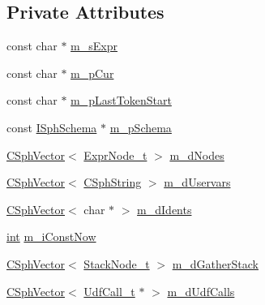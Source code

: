 \subsection*{Private Attributes}
\begin{DoxyCompactItemize}
\item 
const char $\ast$ \hyperlink{classExprParser__t_a094a9e621fcbaf794e7d5772f4d770a1}{m\-\_\-s\-Expr}
\item 
const char $\ast$ \hyperlink{classExprParser__t_a752c228c4b5d69533333e0d96142b2ea}{m\-\_\-p\-Cur}
\item 
const char $\ast$ \hyperlink{classExprParser__t_a655f2b85ad1922c75c9a398bfa564f18}{m\-\_\-p\-Last\-Token\-Start}
\item 
const \hyperlink{classISphSchema}{I\-Sph\-Schema} $\ast$ \hyperlink{classExprParser__t_ae8732abac23a2d42e5c4fb4b24d8fc50}{m\-\_\-p\-Schema}
\item 
\hyperlink{classCSphVector}{C\-Sph\-Vector}$<$ \hyperlink{structExprNode__t}{Expr\-Node\-\_\-t} $>$ \hyperlink{classExprParser__t_aa073e2efec96d566f99e165a6cbebc1e}{m\-\_\-d\-Nodes}
\item 
\hyperlink{classCSphVector}{C\-Sph\-Vector}$<$ \hyperlink{structCSphString}{C\-Sph\-String} $>$ \hyperlink{classExprParser__t_aff645d42872da01c45141459d66b8784}{m\-\_\-d\-Uservars}
\item 
\hyperlink{classCSphVector}{C\-Sph\-Vector}$<$ char $\ast$ $>$ \hyperlink{classExprParser__t_a13189365df48da1f8410f1f7742d2ded}{m\-\_\-d\-Idents}
\item 
\hyperlink{sphinxexpr_8cpp_a4a26e8f9cb8b736e0c4cbf4d16de985e}{int} \hyperlink{classExprParser__t_aa981091ba939b742f87fdd127cdcf36d}{m\-\_\-i\-Const\-Now}
\item 
\hyperlink{classCSphVector}{C\-Sph\-Vector}$<$ \hyperlink{structStackNode__t}{Stack\-Node\-\_\-t} $>$ \hyperlink{classExprParser__t_a088cd58a0ec9a5668d3777ae487ce564}{m\-\_\-d\-Gather\-Stack}
\item 
\hyperlink{classCSphVector}{C\-Sph\-Vector}$<$ \hyperlink{structUdfCall__t}{Udf\-Call\-\_\-t} $\ast$ $>$ \hyperlink{classExprParser__t_a4eb723b6c3c0658a400955ae78e86206}{m\-\_\-d\-Udf\-Calls}
\end{DoxyCompactItemize}
